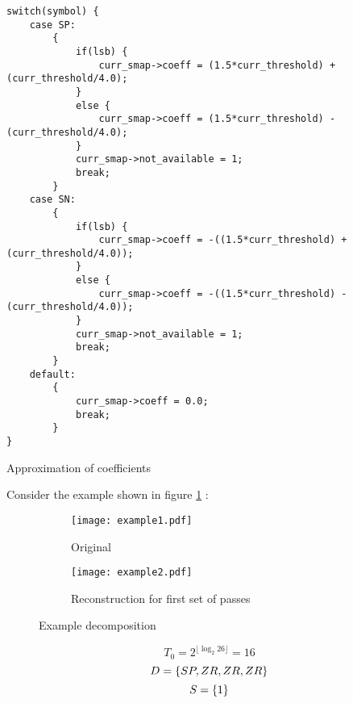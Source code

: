 \documentclass[./A14_Report.tex]{subfiles}
\begin{document}
\begin{code}
\begin{verbatim}
switch(symbol) {
    case SP:
        {
            if(lsb) {
                curr_smap->coeff = (1.5*curr_threshold) + (curr_threshold/4.0);
            }
            else {
                curr_smap->coeff = (1.5*curr_threshold) - (curr_threshold/4.0);
            }
            curr_smap->not_available = 1;
            break;
        }
    case SN:
        {
            if(lsb) {
                curr_smap->coeff = -((1.5*curr_threshold) + (curr_threshold/4.0));
            }
            else {
                curr_smap->coeff = -((1.5*curr_threshold) - (curr_threshold/4.0));
            }
            curr_smap->not_available = 1;
            break;
        }
    default:
        {
            curr_smap->coeff = 0.0;
            break;
        }
}
\end{verbatim}
\caption{Approximation of coefficients \cite{libezw}}
    \label{code:sbtreedef}
\end{code}
\vspace{0.5cm}

Consider the example shown in figure \ref{fig:exa}
\cite{sayood_datac}:

\begin{figure}[H]
    \begin{subfigure}[b]{0.5\textwidth}
        \centering
        \texttt{[image: example1.pdf]}
        \caption{Original}
        \label{fig:exa}
    \end{subfigure}
    \hfill
    \begin{subfigure}[b]{0.5\textwidth}
        \centering
        \texttt{[image: example2.pdf]}
        \caption{Reconstruction for first set of passes}
        \label{fig:exb}
    \end{subfigure}
    \caption{Example decomposition}
    \label{fig:ex}
\end{figure}

\begin{displaymath}
    T_0 = 2^{\lfloor\log_2{26}\rfloor} = 16
\end{displaymath}
\begin{displaymath}
    D = \{SP, ZR, ZR, ZR\}\\
\end{displaymath}
\begin{displaymath}
    S = \{1\}\\
\end{displaymath}
\end{document}
